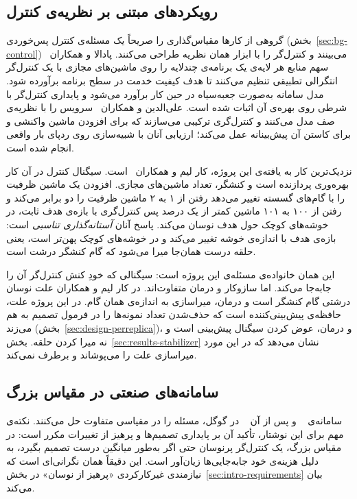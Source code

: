 \subsection{رویکردهای مبتنی بر نظریه‌ی کنترل}
\label{sec:bg-rw-control}

گروهی از کارها مقیاس‌گذاری را صریحاً یک مسئله‌ی کنترل پس‌خوردی (بخش~\ref{sec:bg-control})
می‌بینند و کنترل‌گر را با ابزار همان نظریه طراحی می‌کنند. پادالا و همکاران~\cite{padala2007}
سهم منابع هر لایه‌ی یک برنامه‌ی چندلایه را روی ماشین‌های مجازی با یک کنترل‌گر انتگرالی تطبیقی
تنظیم می‌کنند تا هدف کیفیت خدمت در سطح برنامه برآورده شود. مدل سامانه به‌صورت جعبه‌سیاه در حین
کار برآورد می‌شود و پایداری کنترل‌گر با شرطی روی بهره‌ی آن اثبات شده است. علی‌الدین و
همکاران~\cite{alieldin2012} سرویس را با نظریه‌ی صف مدل می‌کنند و کنترل‌گری ترکیبی می‌سازند که
برای افزودن ماشین واکنشی و برای کاستن آن پیش‌بینانه عمل می‌کند؛ ارزیابی آنان با شبیه‌سازی روی
ردپای بار واقعی انجام شده است.

نزدیک‌ترین کار به یافته‌ی این پروژه، کار لیم و همکاران~\cite{lim2009} است. سیگنال کنترل در آن
کار بهره‌وری پردازنده است و کنشگر، تعداد ماشین‌های مجازی. افزودن یک ماشین ظرفیت را با گام‌های
گسسته تغییر می‌دهد \mdash{} رفتن از ۱ به ۲ ماشین ظرفیت را دو برابر می‌کند و رفتن از ۱۰۰ به ۱۰۱
ماشین کمتر از یک درصد \mdash{} پس کنترل‌گری با بازه‌ی هدف ثابت، در خوشه‌های کوچک حول هدف نوسان
می‌کند. پاسخ آنان \emph{آستانه‌گذاری تناسبی} است: بازه‌ی
هدف با اندازه‌ی خوشه تغییر می‌کند و در خوشه‌های کوچک پهن‌تر است، یعنی حلقه درست همان‌جا میرا
می‌شود که گام کنشگر درشت است.

این همان خانواده‌ی مسئله‌ی این پروژه است: سیگنالی که خودِ کنش کنترل‌گر آن را جابه‌جا می‌کند. اما
سازوکار و درمان متفاوت‌اند. در کار لیم و همکاران علت نوسان درشتی گام کنشگر است و درمان،
میراسازی به اندازه‌ی همان گام. در این پروژه علت، حافظه‌ی پیش‌بینی‌کننده است که حذف‌شدن تعداد
نمونه‌ها را در فرمول تصمیم به هم می‌زند (بخش~\ref{sec:design-perreplica})، و درمان، عوض کردن
سیگنال پیش‌بینی است و نه میرا کردن حلقه. بخش~\ref{sec:results-stabilizer} نشان می‌دهد که در این
مورد میراسازی علت را می‌پوشاند و برطرف نمی‌کند.

\subsection{سامانه‌های صنعتی در مقیاس بزرگ}
\label{sec:bg-rw-industrial}

سامانه‌ی ~\cite{verma2015} و پس از آن ~\cite{rzadca2020} در گوگل، مسئله
را در مقیاسی متفاوت حل می‌کنند. نکته‌ی مهم  برای این نوشتار، تأکید آن بر
پایداری تصمیم‌ها و پرهیز از تغییرات مکرر است: در مقیاس بزرگ، یک کنترل‌گر پرنوسان حتی اگر
به‌طور میانگین درست تصمیم بگیرد، به دلیل هزینه‌ی خود جابه‌جایی‌ها زیان‌آور است. این دقیقاً
همان نگرانی‌ای است که نیازمندی غیرکارکردی «پرهیز از نوسان» در
بخش~\ref{sec:intro-requirements} بیان می‌کند.

